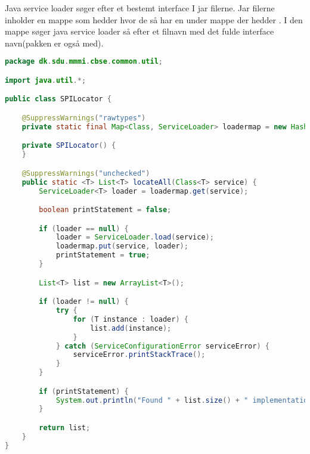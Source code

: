 Java service loader søger efter et bestemt interface I jar filerne. Jar filerne
inholder en mappe som hedder  hvor de så har en under mappe der
hedder . I den mappe søger java service loader så efter et
filnavn med det fulde interface navn(pakken er også med). 


\begin{lstlisting}[caption={dk.sdu.mmmi.cbse.common.util.SPILocator.java}, label={lst:SPILocator.java}, language=java]
package dk.sdu.mmmi.cbse.common.util;

import java.util.*;

public class SPILocator {

    @SuppressWarnings("rawtypes")
    private static final Map<Class, ServiceLoader> loadermap = new HashMap<Class, ServiceLoader>();

    private SPILocator() {
    }

    @SuppressWarnings("unchecked")
    public static <T> List<T> locateAll(Class<T> service) {
        ServiceLoader<T> loader = loadermap.get(service);

        boolean printStatement = false;

        if (loader == null) {
            loader = ServiceLoader.load(service);
            loadermap.put(service, loader);
            printStatement = true;
        }

        List<T> list = new ArrayList<T>();

        if (loader != null) {
            try {
                for (T instance : loader) {
                    list.add(instance);
                }
            } catch (ServiceConfigurationError serviceError) {
                serviceError.printStackTrace();
            }
        }

        if (printStatement) {
            System.out.println("Found " + list.size() + " implementations for interface: " + service.getName());
        }

        return list;
    }
}
\end{lstlisting}


